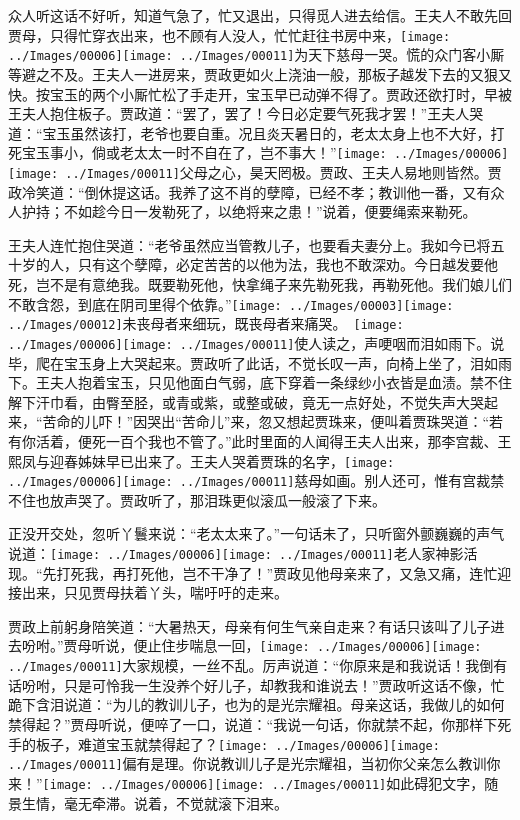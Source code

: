 众人听这话不好听，知道气急了，忙又退出，只得觅人进去给信。王夫人不敢先回贾母，只得忙穿衣出来，也不顾有人没人，忙忙赶往书房中来，{\texttt{[image: ../Images/00006]}\texttt{[image: ../Images/00011]}\footnotesize \kaishu 为天下慈母一哭。}慌的众门客小厮等避之不及。王夫人一进房来，贾政更如火上浇油一般，那板子越发下去的又狠又快。按宝玉的两个小厮忙松了手走开，宝玉早已动弹不得了。贾政还欲打时，早被王夫人抱住板子。贾政道：``罢了，罢了！今日必定要气死我才罢！''王夫人哭道：``宝玉虽然该打，老爷也要自重。况且炎天暑日的，老太太身上也不大好，打死宝玉事小，倘或老太太一时不自在了，岂不事大！''{\texttt{[image: ../Images/00006]}\texttt{[image: ../Images/00011]}\footnotesize \kaishu 父母之心，昊天罔极。贾政、王夫人易地则皆然。}贾政冷笑道：``倒休提这话。我养了这不肖的孽障，已经不孝；教训他一番，又有众人护持；不如趁今日一发勒死了，以绝将来之患！''说着，便要绳索来勒死。

王夫人连忙抱住哭道：``老爷虽然应当管教儿子，也要看夫妻分上。我如今已将五十岁的人，只有这个孽障，必定苦苦的以他为法，我也不敢深劝。今日越发要他死，岂不是有意绝我。既要勒死他，快拿绳子来先勒死我，再勒死他。我们娘儿们不敢含怨，到底在阴司里得个依靠。''{\texttt{[image: ../Images/00003]}\texttt{[image: ../Images/00012]}\footnotesize \kaishu 未丧母者来细玩，既丧母者来痛哭。　\texttt{[image: ../Images/00006]}\texttt{[image: ../Images/00011]}\footnotesize \kaishu 使人读之，声哽咽而泪如雨下。}说毕，爬在宝玉身上大哭起来。贾政听了此话，不觉长叹一声，向椅上坐了，泪如雨下。王夫人抱着宝玉，只见他面白气弱，底下穿着一条绿纱小衣皆是血渍。禁不住解下汗巾看，由臀至胫，或青或紫，或整或破，竟无一点好处，不觉失声大哭起来，``苦命的儿吓！''因哭出``苦命儿''来，忽又想起贾珠来，便叫着贾珠哭道：``若有你活着，便死一百个我也不管了。''此时里面的人闻得王夫人出来，那李宫裁、王熙凤与迎春姊妹早已出来了。王夫人哭着贾珠的名字，{\texttt{[image: ../Images/00006]}\texttt{[image: ../Images/00011]}\footnotesize \kaishu 慈母如画。}别人还可，惟有宫裁禁不住也放声哭了。贾政听了，那泪珠更似滚瓜一般滚了下来。

正没开交处，忽听丫鬟来说：``老太太来了。''一句话未了，只听窗外颤巍巍的声气说道：{\texttt{[image: ../Images/00006]}\texttt{[image: ../Images/00011]}\footnotesize \kaishu 老人家神影活现。}``先打死我，再打死他，岂不干净了！''贾政见他母亲来了，又急又痛，连忙迎接出来，只见贾母扶着丫头，喘吁吁的走来。

贾政上前躬身陪笑道：``大暑热天，母亲有何生气亲自走来？有话只该叫了儿子进去吩咐。''贾母听说，便止住步喘息一回，{\texttt{[image: ../Images/00006]}\texttt{[image: ../Images/00011]}\footnotesize \kaishu 大家规模，一丝不乱。}厉声说道：``你原来是和我说话！我倒有话吩咐，只是可怜我一生没养个好儿子，却教我和谁说去！''贾政听这话不像，忙跪下含泪说道：``为儿的教训儿子，也为的是光宗耀祖。母亲这话，我做儿的如何禁得起？''贾母听说，便啐了一口，说道：``我说一句话，你就禁不起，你那样下死手的板子，难道宝玉就禁得起了？{\texttt{[image: ../Images/00006]}\texttt{[image: ../Images/00011]}\footnotesize \kaishu 偏有是理。}你说教训儿子是光宗耀祖，当初你父亲怎么教训你来！''{\texttt{[image: ../Images/00006]}\texttt{[image: ../Images/00011]}\footnotesize \kaishu 如此碍犯文字，随景生情，毫无牵滞。}说着，不觉就滚下泪来。


